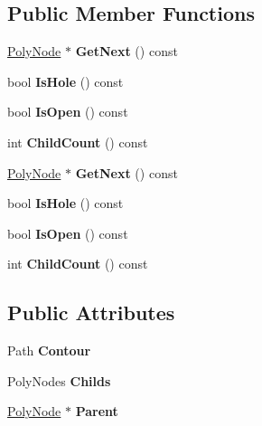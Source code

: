 \subsection*{Public Member Functions}
\begin{DoxyCompactItemize}
\item 
\mbox{\label{classClipperLib_1_1PolyNode_adbcb861001d8bfbd609c4ba4f4a19a58}} 
\hyperlink{classClipperLib_1_1PolyNode}{Poly\+Node} $\ast$ {\bfseries Get\+Next} () const
\item 
\mbox{\label{classClipperLib_1_1PolyNode_a0467801cae1b28ad8a4917b96e551536}} 
bool {\bfseries Is\+Hole} () const
\item 
\mbox{\label{classClipperLib_1_1PolyNode_ac9ade640af2515976d337b65e8e84776}} 
bool {\bfseries Is\+Open} () const
\item 
\mbox{\label{classClipperLib_1_1PolyNode_a19128db6fb2aca66555231edaffa7ade}} 
int {\bfseries Child\+Count} () const
\item 
\mbox{\label{classClipperLib_1_1PolyNode_a54053ef013f54ba65ac69f9467bcbbd5}} 
\hyperlink{classClipperLib_1_1PolyNode}{Poly\+Node} $\ast$ {\bfseries Get\+Next} () const
\item 
\mbox{\label{classClipperLib_1_1PolyNode_a0467801cae1b28ad8a4917b96e551536}} 
bool {\bfseries Is\+Hole} () const
\item 
\mbox{\label{classClipperLib_1_1PolyNode_ac9ade640af2515976d337b65e8e84776}} 
bool {\bfseries Is\+Open} () const
\item 
\mbox{\label{classClipperLib_1_1PolyNode_a19128db6fb2aca66555231edaffa7ade}} 
int {\bfseries Child\+Count} () const
\end{DoxyCompactItemize}
\subsection*{Public Attributes}
\begin{DoxyCompactItemize}
\item 
\mbox{\label{classClipperLib_1_1PolyNode_a1d08b8a9499ff8cb89d5d63a12f881ea}} 
Path {\bfseries Contour}
\item 
\mbox{\label{classClipperLib_1_1PolyNode_a7ac59aea508951a4c979bfca8913261d}} 
Poly\+Nodes {\bfseries Childs}
\item 
\mbox{\label{classClipperLib_1_1PolyNode_af031263e359cb8263d4ba2bc7e9264d3}} 
\hyperlink{classClipperLib_1_1PolyNode}{Poly\+Node} $\ast$ {\bfseries Parent}
\end{DoxyCompactItemize}
